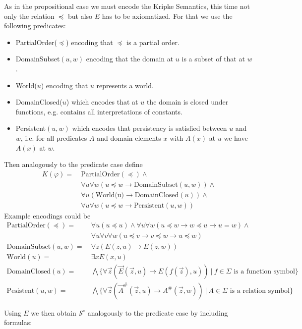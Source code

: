 \documentclass[a4paper,UKenglish,cleveref, autoref, thm-restate]{lipics-v2021}
\begin{document}
As in the propositional case we must encode the Kripke Semantics, this time not only the relation $\preceq$ but also $E$ has to be axiomatized. For that we use the following predicates:
\begin{itemize}
	\item PartialOrder($\preceq$) encoding that $\preceq$ is a partial order.
	\item DomainSubset$(u, w)$ encoding that the domain at $u$ is a subset of that at $w$.
	\item World($u$) encoding that $u$ represents a world.
	\item DomainClosed($u$) which encodes that at $u$ the domain is closed under functions, e.g. contains all interpretations of constants.
	\item Persistent$(u, w)$ which encodes that persistency is satisfied between $u$ and $w$, i.e. for all predicates $A$ and domain elements $x$ with $A(x)$ at $u$ we have $A(x)$ at $w$.
\end{itemize}
Then analogously to the predicate case define
\begin{align*}
	K(\varphi) = \:& \text{PartialOrder}(\preceq) \wedge \\
				 & \forall u \forall w (u\preceq w\to \text{DomainSubset}(u, w)) \wedge\\
				 & \forall u(\text{World(u)}\to \text{DomainClosed}(u))\wedge\\
				 & \forall u\forall w (u\preceq w\to \text{Persistent}(u, w))
\end{align*}
Example encodings could be
\begin{align*}
	\text{PartialOrder}(\preceq) = &\:\forall u(u\preceq u)\wedge\forall u\forall w(u\preceq w\to w\preceq u\to u = w)\wedge\\&\:\forall u\forall v\forall w(u\preceq v\to v\preceq w\to u\preceq w)\\
	\text{DomainSubset}(u, w) = &\:\forall z(E(z, u)\to E(z, w))\\
	\text{World}(u) = &\:\exists xE(x, u)\\
	\text{DomainClosed}(u) = &\:\bigwedge\{\forall\vec z(\vec E(\vec z, u)\to E(f(\vec z), u))\:|\:\text{$f\in\Sigma$ is a function symbol}\}\\
	\text{Pesistent}(u, w) = &\:\bigwedge\{\forall\vec z(\vec A^\#(\vec z, u)\to A^\#(\vec z, w))\:|\:\text{$A\in\Sigma$ is a relation symbol}\}
\end{align*}

Using $E$ we then obtain $\mathcal S^\circ$ analogously to the predicate case by including formulas:
\end{document}
